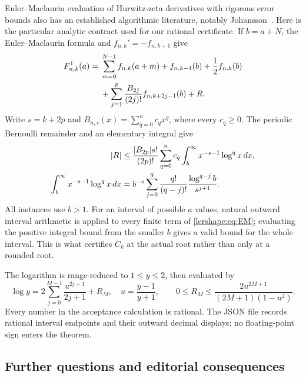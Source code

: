 Euler--Maclaurin evaluation of Hurwitz-zeta derivatives with rigorous
error bounds also has an established algorithmic literature, notably
Johansson~\cite{lershape:Johansson}. Here is the particular analytic
contract used for our rational certificate. If $b=a+N$, the
Euler--Maclaurin formula and $f_{n,k}'=-f_{n,k+1}$ give
\begin{align}\label{lershape:eq:EM}
 F_{n,k}^{1}(a)={}&\sum_{m=0}^{N-1}f_{n,k}(a+m)
 +f_{n,k-1}(b)+\frac12f_{n,k}(b)\notag\\
 &+\sum_{j=1}^{p}\frac{B_{2j}}{(2j)!}f_{n,k+2j-1}(b)+R.
\end{align}
Write $s=k+2p$ and
$B_{n,s}(x)=\sum_{q=0}^n c_qx^q$, where every $c_q\geq0$. The
periodic Bernoulli remainder and an elementary integral give
\begin{align}\label{lershape:eq:EM-bound}
 |R|&\leq\frac{|B_{2p}|s!}{(2p)!}
 \sum_{q=0}^nc_q\int_b^\infty x^{-s-1}\log^q x\,dx,\notag\\
 \int_b^\infty x^{-s-1}\log^q x\,dx
 &=b^{-s}\sum_{j=0}^q
 \frac{q!}{(q-j)!}\frac{\log^{q-j}b}{s^{j+1}}.
\end{align}
All instances use $b>1$. For an interval of possible $a$ values, natural
outward interval arithmetic is applied to every finite term of
\eqref{lershape:eq:EM}; evaluating the positive integral bound from
the smaller $b$ gives a valid bound for the whole interval. This is what
certifies $C_k$ at the actual root rather than only at a rounded root.

The logarithm is range-reduced to $1\leq y\leq2$, then evaluated by
\[
 \log y=2\sum_{j=0}^{M-1}\frac{u^{2j+1}}{2j+1}+R_M,
 \quad u=\frac{y-1}{y+1},\qquad
 0\leq R_M\leq\frac{2u^{2M+1}}{(2M+1)(1-u^2)}.
\]
Every number in the acceptance calculation is rational. The JSON file
records rational interval endpoints and their outward decimal displays;
no floating-point sign enters the theorem.

\subsection{Further questions and editorial consequences}

